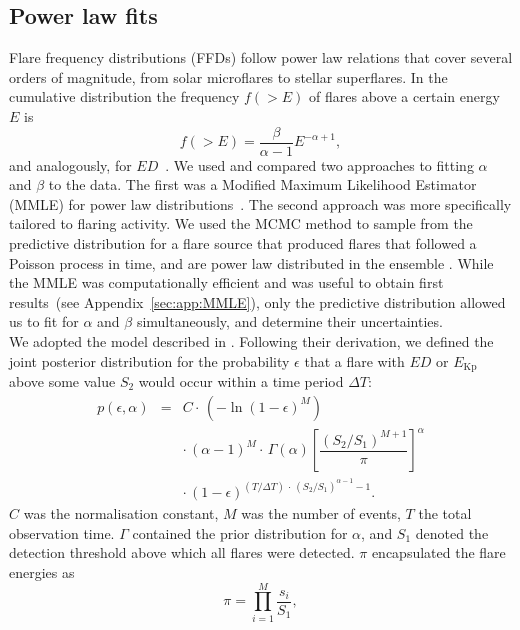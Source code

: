 \documentclass{aa}
\begin{document}
\subsection{Power law fits}
\label{powerlawfits}
Flare frequency distributions (FFDs) follow power law relations that cover several orders of magnitude, from solar microflares to stellar superflares. In the cumulative distribution the frequency $f(>E)$ of flares above a certain energy $E$ is
\begin{equation}
f(>E) = \dfrac{\beta}{\alpha - 1}E^{-\alpha + 1},
\label{eqn:cumdist}
\end{equation}
and analogously, for $ED$~\citep{gershberg1972}. We used and compared two approaches to fitting $\alpha$ and $\beta$ to the data. The first was a Modified Maximum Likelihood Estimator (MMLE) for power law distributions~\citep{maschberger_powerlaw_2009}. The second approach was more specifically tailored to flaring activity. We used the MCMC method to sample from the predictive distribution for a flare source that produced flares that followed a Poisson process in time, and are power law distributed in the ensemble \citep{wheatland_flaresbayes_2004}. While the MMLE was computationally efficient and was useful to obtain first results~(see Appendix~\ref{sec:app:MMLE}), only the predictive distribution allowed us to fit for $\alpha$ and $\beta$ simultaneously, and determine their uncertainties.
\\
We adopted the model described in \citet{wheatland_flaresbayes_2004}. Following their derivation, we defined the joint posterior distribution for the probability $\epsilon$ that a flare with $ED$ or $E_\mathrm{Kp}$ above some value $S_2$ would occur within a time period $\Delta T$:
\begin{eqnarray}
\label{joint_posterior}
p(\epsilon, \alpha) &=& C \cdot\, (-\ln(1 - \epsilon)^{M})\nonumber\\
                    && \cdot\, (\alpha-1)^M \cdot\, \Gamma(\alpha) \left[\dfrac{(S_2 / S_1)^{M+1}}{\pi} \right]^{\alpha}\nonumber\\
                    && \cdot\, (1-\epsilon)^{(T / \Delta T) \,\cdot\, (S_2 /S_1)^{\alpha-1} -1 }.
\end{eqnarray}
$C$ was the normalisation constant, $M$ was the number of events, $T$ the total observation time. $\Gamma$ contained the prior distribution for $\alpha$, and $S_1$ denoted the detection threshold above which all flares were detected. $\pi$ encapsulated the flare energies as
\begin{equation}
    \pi = \displaystyle \prod_{i=1}^M \dfrac{s_i}{S_1},
\end{equation}
\end{document}

